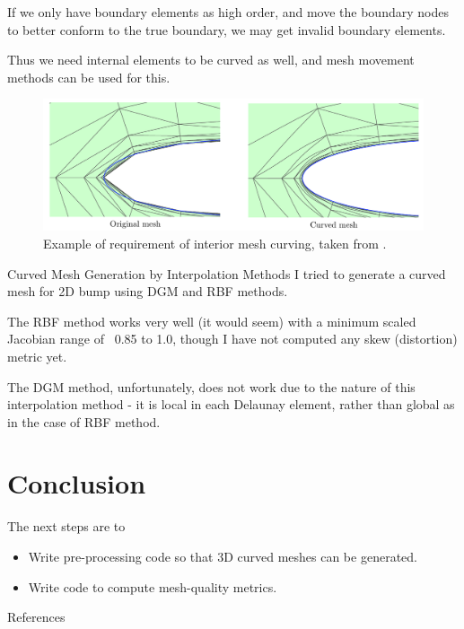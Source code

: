 \documentclass[mathserif]{beamer}
\begin{document}
\begin{frame}
If we only have boundary elements as high order, and move the boundary nodes to better conform to the true boundary, we may get invalid boundary elements.

Thus we need internal elements to be curved as well, and mesh movement methods can be used for this.

\begin{figure}
\includegraphics[scale=0.25]{curved-mesh-example}
\caption{Example of requirement of interior mesh curving, taken from \cite{perssonelast}.}
\end{figure}
\end{frame}

\begin{frame}{Curved Mesh Generation by Interpolation Methods}
I tried to generate a curved mesh for 2D bump using DGM and RBF methods.

The RBF method works very well (it would seem) with a minimum scaled Jacobian range of ~0.85 to 1.0, though I have not computed any skew (distortion) metric yet.

The DGM method, unfortunately, does not work due to the nature of this interpolation method - it is local in each Delaunay element, rather than global as in the case of RBF method.
\end{frame}

\section{Conclusion}
\begin{frame}
The next steps are to
\begin{itemize}
\item Write pre-processing code so that 3D curved meshes can be generated.
\item Write code to compute mesh-quality metrics.
\end{itemize}
\end{frame}

\begin{frame}[allowframebreaks]{References}

\end{frame}
\end{document}
